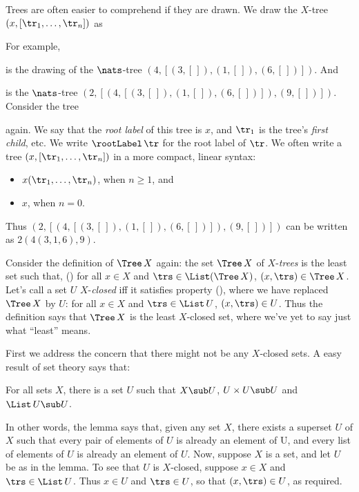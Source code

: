 Trees are often easier to comprehend if they are drawn.
We draw the $X$-tree $(x,[\tr_1,\ldots,\tr_n])$ as
\begin{center}

\end{center}
For example,
\begin{center}

\end{center}
is the drawing of the $\nats$-tree $(4,[(3,[\,]), (1,[\,]), (6,[\,])])$.
And
\begin{center}

\end{center}
is the $\nats$-tree $(2,[(4,[(3,[\,]), (1,[\,]), (6,[\,])]),(9,[\,])])$.
Consider the tree
\begin{center}

\end{center}
again.
We say that the \emph{root label} of this tree is $x$, and $\tr_1$ is the tree's
\emph{first child}, etc.
We write $\rootLabel\,\tr$ for the root label of $\tr$.
We often write a tree $(x,[\tr_1,\ldots,\tr_n])$ in a more
compact, linear syntax:
\begin{itemize}
\item $x(\tr_1,\ldots,\tr_n)$, when $n\geq 1$, and

\item $x$, when $n=0$.
\end{itemize}
Thus $(2,[(4,[(3,[\,]), (1,[\,]), (6,[\,])]),(9,[\,])])$
can be written as $2(4(3,1,6),9)$.

Consider the definition of $\Tree\,X$ again: the set $\Tree\,X$ of
$X$-\emph{trees} is the least set such that, (\dag) for all $x\in X$ and
$\trs\in\List(\Tree\,X)$, $(x,\trs)\in\Tree\,X$.
Let's call a set $U$ $X$-\emph{closed} iff it satisfies property (\dag),
where we have replaced $\Tree\,X$ by $U$:
for all $x\in X$ and $\trs\in\List\,U$, $(x,\trs)\in U$.
Thus the definition says that $\Tree\,X$ is the least $X$-closed set,
where we've yet to say just what ``least'' means.

First we address the concern that there might not be any $X$-closed sets.
A easy result of set theory says that:

\begin{lemma}
\label{ClosureLem}
For all sets $X$, there is a set $U$ such that
$X\sub U$, $U\times U\sub U$ and $\List\,U\sub U$.
\end{lemma}

In other words, the lemma says that, given any set $X$, there
exists a superset $U$ of $X$ such that every pair of elements of $U$
is already an element of U, and every list of elements of $U$ is
already an element of $U$.  Now, suppose $X$ is a set, and let $U$ be
as in the lemma.  To see that $U$ is $X$-closed, suppose $x\in
X$ and $\trs\in\List\,U$.  Thus $x\in U$ and $\trs\in U$, so that
$(x,\trs)\in U$, as required.

